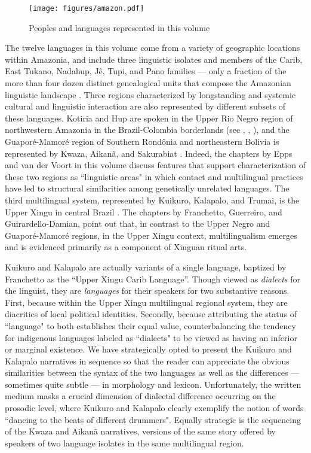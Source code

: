 \documentclass[output=paper,
modfonts,nonflat
]{langsci/langscibook}
\begin{document}
 
\begin{figure}[t]
\texttt{[image: figures/amazon.pdf]}
\caption{Peoples and languages represented in this volume}
\end{figure}

The twelve languages in this volume come from a variety of geographic locations within Amazonia, and include three linguistic isolates and members of the Carib, East Tukano, Nadahup, Jê, Tupi, and Pano families — only a fraction of the more than four dozen distinct genealogical units that compose the Amazonian linguistic landscape \citep[1]{EppsSal2013}. Three regions characterized by longstanding and systemic cultural and linguistic interaction are also represented by different subsets of these languages. Kotiria and Hup are spoken in the Upper Rio Negro region of northwestern Amazonia in the Brazil-Colombia borderlands (see \citealt{Aikhenvald2002}, \citealt[73--84]{Aikhenvald2012}, \citealt{EppsStenz2013}), and the Guaporé-Mamoré region of Southern Rondônia and northeastern Bolivia is represented by Kwaza, Aikanã, and Sakurabiat \citep{Crevels2008}. Indeed, the chapters by Epps and van der Voort in this volume discuss features that support characterization of these two regions as “linguistic areas" in which contact and multilingual practices have led to structural similarities among genetically unrelated languages. The third multilingual system, represented by Kuikuro, Kalapalo, and Trumai, is the Upper Xingu in central Brazil \citep{Franchetto2011}. The chapters by Franchetto, Guerreiro, and Guirardello-Damian, point out that, in contrast to the Upper Negro and Guaporé-Mamoré regions, in the Upper Xingu context, multilingualism emerges and is evidenced primarily as a component of Xinguan ritual arts. 
    
Kuikuro and Kalapalo are actually variants of a single language, baptized by Franchetto as the “Upper Xingu Carib Language”. Though viewed as \textit{dialects} for the linguist, they are \textit{languages} for their speakers for two substantive reasons. First, because within the Upper Xingu multilingual regional system, they are diacritics of local political identities. Secondly, because attributing the status of “language" to both establishes their equal value, counterbalancing the tendency for indigenous languages labeled as “dialects" to be viewed as having an inferior or marginal existence. We have strategically opted to present the Kuikuro and Kalapalo narratives in sequence so that the reader can appreciate the obvious similarities between the syntax of the two languages as well as the  differences — sometimes quite subtle — in morphology and lexicon.  Unfortunately, the written medium masks a crucial dimension of dialectal difference occurring on the prosodic level, where Kuikuro and Kalapalo clearly exemplify the notion of words “dancing to the beats of different drummers". Equally strategic is the sequencing of the Kwaza and  Aikanã narratives, versions of the same story offered by speakers of two language isolates in the same multilingual region. 
    
\end{document}
